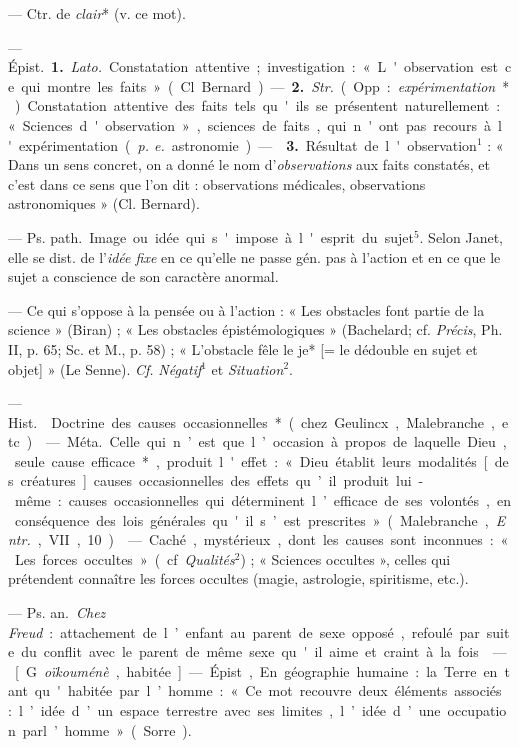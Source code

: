 \begin{itemize}[leftmargin=1cm, label=, itemsep=1pt]
 — Ctr. de {\it clair}* (v. ce mot).

 —  \si{Épist.} {\bf 1.} {\it Lato.}
Constatation attentive; investigation : « L'observation est ce qui montre les
faits » (Cl. Bernard). — {\bf 2.} {\it Str.} (Opp. : {\it expérimentation}*).
Constatation attentive des faits tels qu'ils se présentent naturellement :
« Sciences d'observation », sciences de faits, qui n'ont pas recours à
l'expérimentation ({\it p. e.} astronomie). —  {\bf 3.}
Résultat de l'observation$^1$ : « Dans un sens concret, on a donné le nom
d'{\it observations} aux faits constatés, et c’est dans ce sens que l’on dit :
observations médicales, observations astronomiques » (Cl. Bernard).

 — \si{Ps. path.} Image ou idée qui s'impose à l'esprit du
sujet$^5$. Selon Janet, elle se dist. de l’{\it idée fixe} en ce qu’elle ne
passe gén. pas à l’action et en ce que le sujet a conscience de son caractère
anormal.

 — Ce qui s'oppose à la pensée ou à l’action : « Les obstacles
font partie de la science » (Biran) ; « Les obstacles épistémologiques
» (Bachelard; cf. {\it Précis}, Ph. II, p. 65; Sc. et M., p. 58) ;
« L’obstacle fêle le je* [= le dédouble en sujet et objet] » (Le Senne).
{\it Cf.} {\it Négatif}$^1$ et {\it Situation}$^2$.

 — \si{Hist.}  Doctrine des causes
occasionnelles* (chez Geulincx, Malebranche, etc.).

 — \si{Méta.} Celle qui n’est que l’occasion à
propos de laquelle Dieu, seule cause efficace*, produit l'effet : « Dieu
établit leurs modalités [des créatures] causes occasionnelles des effets
qu’il produit lui-même : causes occasionnelles qui déterminent l’efficace de
ses volontés, en conséquence des lois générales qu'il s’est
prescrites » (Malebranche, {\it Entr.}, VII, 10).

 — Caché, mystérieux, dont les causes sont inconnues : « Les
forces occultes » (cf. {\it Qualités}$^2$) ; « Sciences occultes », celles
qui prétendent connaître les forces occultes (magie, astrologie, spiritisme,
etc.).

 — \si{Ps. an.} {\it Chez Freud} : attachement de
l’enfant au parent de sexe opposé, refoulé par suite du conflit avec le
parent de même sexe qu'il aime et craint à la fois.

 — [G. {\it oïkouménè}, habitée] — Épist, En géographie
humaine : la Terre en tant qu'habitée par l’homme : « Ce mot recouvre deux
éléments associés : l’idée d’un espace terrestre avec ses limites, l’idée
d’une occupation parl’homme » (Sorre).


\end{itemize}
